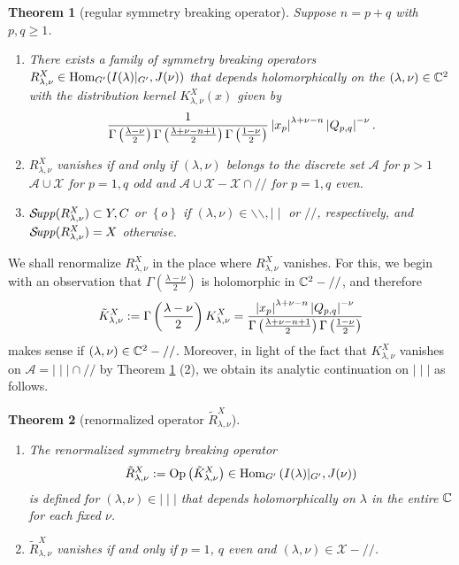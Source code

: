 \documentclass[reqno,12pt]{pja00} %
\newtheorem{theorem}{Theorem}[section]
\newcommand{\Hom}{\mbox{\normalfont Hom}}
\newcommand{\Supp}{\mathcal{S}\!{\it upp}}
\theoremstyle{definition}
\theoremstyle{exampstyle} \newtheorem{examp}[theorem]{Theorem}
\newcommand{\Op}{\mbox{\normalfont Op}}
\renewcommand{\Q}{Q_{p,q}}
\let\setminus-
\begin{document}
\begin{theorem}[regular symmetry breaking operator]\label{thm:regular}
	Suppose $n=p+q$ with $p,q\ge1$.
	\begin{enumerate}[(1)]
		\item There exists a family of symmetry breaking operators $R_{\lambda,\nu}^X\in\Hom_{G'}(I(\lambda)\kern-0.1cm\mid_{G'},J(\nu))$ that depends 
			holomorphically on the  $(\lambda,\nu)\in\mathbb{C}^2$ with the distribution kernel $K_{\lambda,\nu}^X(x)$ given by\begin{equation*}
		\frac{1}{\Gamma\left( \frac{\lambda-\nu}{2}\right)\Gamma\left( \frac{\lambda+\nu-n+1}{2}\right)\Gamma\left( \frac{1-\nu}{2}   \right)}\myabs{x_p}^{\lambda+\nu-n}
		\myabs{\Q}^{-\nu}.
	\end{equation*}
\item 
	$R^X_{\lambda,\nu}$ vanishes if and only if $(\lambda,\nu)$ belongs to the discrete set $\mathcal{A}$ for $p>1$\uwave{; }$\mathcal{A}\cup\mathcal{X}$ for $p=1,q$ odd\uwave{;}
	and $\mathcal{A}\cup\mathcal{X}-\mathcal{X}\cap//$ for $p=1,q$ even.
\item 
	$\Supp(R_{\lambda,\nu}^X)\subset Y,C$ or $\left\{ o \right\}$ if $(\lambda,\nu)\in\backslash\backslash,\mid\mid$ or $//$, respectively, and $\Supp(R_{\lambda,\nu}^X)=X$
	otherwise.
	\end{enumerate}
\end{theorem}
We shall renormalize $R_{\lambda,\nu}^X$ in the place where
$R_{\lambda,\nu}^X$ vanishes. For this, we begin with
an observation that $\Gamma\left( \frac{\lambda-\nu}{2} \right)$ is holomorphic in $\C^2\setminus //$, and therefore\begin{equation*}
	\tilde{K}_{\lambda,\nu}^X:=\Gamma\left( \frac{\lambda-\nu}{2} \right)K_{\lambda,\nu}^X
	=\frac{\myabs{x_p}^{\lambda+\nu-n}\myabs{\Q}^{-\nu}}{\Gamma\left( \frac{\lambda+\nu-n+1}{2} \right)\Gamma\left( \frac{1-\nu}{2} \right)}
\end{equation*}
makes sense if $(\lambda,\nu)\in\C^2\setminus //$. Moreover, in light of the fact that $K_{\lambda,\nu}^X$ vanishes on $\mathcal{A}=\mid\mid\mid\cap//$ by
Theorem \ref{thm:regular} (2), we obtain its analytic continuation on $\mid\mid\mid$ as follows.\begin{theorem}[renormalized operator $\tilde{R}_{\lambda,\nu}^X$]
	\begin{enumerate}[(1)]
		\item The renormalized symmetry breaking operator\begin{equation*}
				\tilde{R}_{\lambda,\nu}^X:=\Op\left( \tilde{K}_{\lambda,\nu}^X \right)\in\Hom_{G'}\left( I(\lambda)\kern-0.1cm\mid_{G'},J(\nu) \right)
			\end{equation*}is defined for $(\lambda,\nu)\in\mid\mid\mid$ that depends holomorphically 
			on $\lambda$ in the entire $\mathbb{C}$ for each fixed $\nu$.
		\item $\tilde{R}^X_{\lambda,\nu}$ vanishes if and only if $p=1$, $q$ even and $(\lambda,\nu)\in\mathcal{X}\setminus//$.
	\end{enumerate}
	\label{thm:X2}
\end{theorem}
\end{document}
